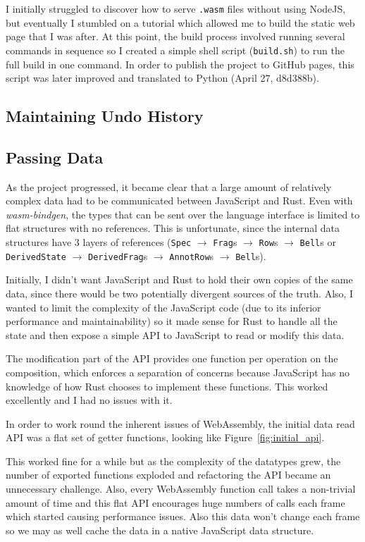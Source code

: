 \documentclass[12pt]{article}
\begin{document}
I initially struggled to discover how to serve \verb|.wasm| files
without using NodeJS, but eventually I stumbled on a tutorial which allowed me to build the static
web page that I was after.  At this point, the build process involved running several commands in
sequence so I created a simple shell script (\verb|build.sh|) to run the full build in one command.
In order to publish the project to GitHub pages, this script was later improved and translated to
Python (April 27, d8d388b).

\subsection{Maintaining Undo History}

\subsection{Passing Data}

As the project progressed, it became clear that a large amount of relatively complex data had to be
communicated between JavaScript and Rust.  Even with \emph{wasm-bindgen}, the types that can be sent
over the language interface is limited to flat structures with no references.  This is unfortunate,
since the internal data structures have 3 layers of references (\verb|Spec| $\to$ \verb|Frag|s $\to$
\verb|Row|s $\to$ \verb|Bell|s or \verb|DerivedState| $\to$ \verb|DerivedFrag|s $\to$
\verb|AnnotRow|s $\to$ \verb|Bell|s).

Initially, I didn't want JavaScript and Rust to hold their own copies of the same data, since there
would be two potentially divergent sources of the truth.  Also, I wanted to limit the complexity of
the JavaScript code (due to its inferior performance and maintainability) so it made sense for Rust
to handle all the state and then expose a simple API to JavaScript to read or modify this data.

The modification part of the API provides one function per operation on the composition, which
enforces a separation of concerns because JavaScript has no knowledge of how Rust chooses to
implement these functions.  This worked excellently and I had no issues with it.

In order to work round the inherent issues of WebAssembly, the initial data read API was a flat set
of getter functions, looking like Figure~\ref{fig:initial_api}.

This worked fine for a while but as the complexity of the datatypes grew, the number of exported
functions exploded and refactoring the API became an unnecessary challenge.  Also, every WebAssembly
function call takes a non-trivial amount of time and this flat API encourages huge numbers of calls
each frame which started causing performance issues.  Also this data won't change each frame so we
may as well cache the data in a native JavaScript data structure.
\end{document}
